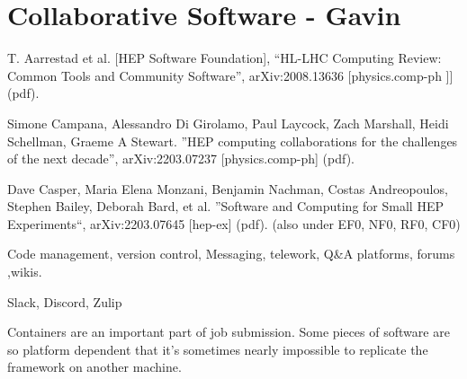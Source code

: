 \begin{comment}
Harrison B. Prosper, Sezen Sekmen, Gokhan Unel. ”Analysis Description Language: A DSL for HEP Analysis”, arXiv:2203.09886 [hep-ph] (pdf). (also relevant to CompF07)
- emphasizes the need for semantic analysis to make collaboration with theory easier
- also makes an analysis self-documenting (Amy: to a degree)
- prefers a language-independent DSL, an "external DSL" for easier interoperability
- identifies DSL requirements as (1) easily understood by a physicist, (2) unambiguous, (3) domain complete.  I feel like (1) and possibly (2) need more clarification for this to be a true requirement list
- people do use the Analysis Description Language (analysis schools, Future Circular Collider studies), not clear if the use is limited to a specific group or groups, no complete LHC analysis yet
- Obvious enhancement of existing DSL would be to re-write to target LLVM.  (Amy: huh, okay, maybe it is time to think about DSLs?)

C. Backhouse. ”The CAFAna framework for neutrino analysis”, arXiv:2203.13768 [hep-ex] (pdf). (also under NF01)

\end{comment}

\section{Collaborative Software - Gavin}
T. Aarrestad et al. [HEP Software Foundation], “HL-LHC Computing Review: Common Tools and Community Software”, arXiv:2008.13636 [physics.comp-ph ]] (pdf).

Simone Campana, Alessandro Di Girolamo, Paul Laycock, Zach Marshall, Heidi Schellman, Graeme A Stewart. ”HEP computing collaborations for the challenges of the next decade”, arXiv:2203.07237 [physics.comp-ph] (pdf).

Dave Casper, Maria Elena Monzani, Benjamin Nachman, Costas Andreopoulos, Stephen Bailey, Deborah Bard, et al. ”Software and Computing for Small HEP Experiments“, arXiv:2203.07645 [hep-ex] (pdf). (also under EF0, NF0, RF0, CF0)



Code management, version control, Messaging, telework, Q\&A platforms, forums ,wikis.

Slack, Discord, Zulip 

Containers are an important part of job submission.
Some pieces of software are so platform dependent that it's sometimes nearly impossible to replicate the framework on another machine.

